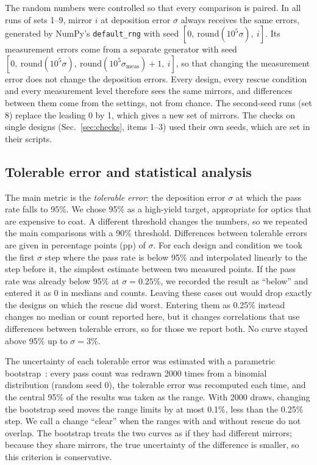 The random numbers were controlled so that every comparison is paired. In all runs of sets 1--9, mirror $i$ at deposition error $\sigma$ always receives the same errors, generated by NumPy's \texttt{default\_rng} with seed $[0,\ \mathrm{round}(10^5\sigma),\ i]$. Its measurement errors come from a separate generator with seed $[0,\ \mathrm{round}(10^5\sigma),\ \mathrm{round}(10^5\sigma_{\mathrm{meas}})+1,\ i]$, so that changing the measurement error does not change the deposition errors. Every design, every rescue condition and every measurement level therefore sees the same mirrors, and differences between them come from the settings, not from chance. The second-seed runs (set 8) replace the leading 0 by 1, which gives a new set of mirrors. The checks on single designs (Sec.~\ref{sec:checks}, items 1--3) used their own seeds, which are set in their scripts.

\subsection{Tolerable error and statistical analysis}

The main metric is the \emph{tolerable error}: the deposition error $\sigma$ at which the pass rate falls to 95\%. We chose 95\% as a high-yield target, appropriate for optics that are expensive to coat. A different threshold changes the numbers, so we repeated the main comparisons with a 90\% threshold. Differences between tolerable errors are given in percentage points (pp) of $\sigma$. For each design and condition we took the first $\sigma$ step where the pass rate is below 95\% and interpolated linearly to the step before it, the simplest estimate between two measured points. If the pass rate was already below 95\% at $\sigma = 0.25\%$, we recorded the result as ``below'' and entered it as 0 in medians and counts. Leaving these cases out would drop exactly the designs on which the rescue did worst. Entering them as 0.25\% instead changes no median or count reported here, but it changes correlations that use differences between tolerable errors, so for those we report both. No curve stayed above 95\% up to $\sigma = 3\%$.

The uncertainty of each tolerable error was estimated with a parametric bootstrap~\cite{Efron1979}: every pass count was redrawn 2000 times from a binomial distribution (random seed 0), the tolerable error was recomputed each time, and the central 95\% of the results was taken as the range. With 2000 draws, changing the bootstrap seed moves the range limits by at most 0.1\%, less than the 0.25\% step. We call a change ``clear'' when the ranges with and without rescue do not overlap. The bootstrap treats the two curves as if they had different mirrors; because they share mirrors, the true uncertainty of the difference is smaller, so this criterion is conservative.

